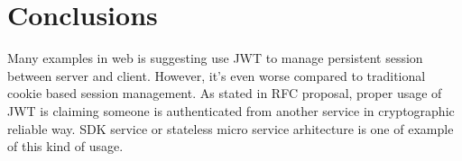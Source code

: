 \documentclass[journal,article,submit,moreauthors,pdftex,10pt,a4paper]{mdpi}
\begin{document}


\section{Conclusions}
Many examples in web is suggesting use JWT to manage persistent session between server and client. However, it's even worse compared to traditional cookie based session management. As stated in RFC proposal, proper usage of JWT is claiming someone is authenticated from another service in cryptographic reliable way. SDK service or stateless micro service arhitecture is one of example of this kind of usage.

\vspace{6pt} 





\end{document}
